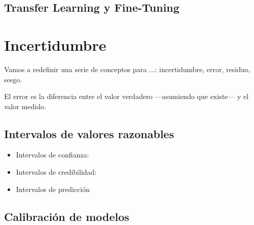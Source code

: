 

\subsection{Transfer Learning y Fine-Tuning}





\section{Incertidumbre}


Vamos a redefinir una serie de conceptos para ...: incertidumbre, error, residuo, sesgo.

El error es la diferencia entre el valor verdadero ---asumiendo que existe--- y el valor medido.




\subsection{Intervalos de valores razonables}



\begin{itemize}
    \item Intervalos de confianza:
    \item Intervalos de credibilidad: 
    \item Intervalos de predicción
\end{itemize}




\subsection{Calibración de modelos}







